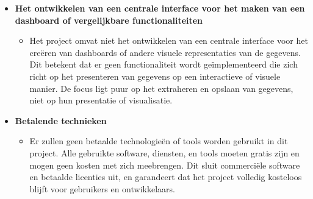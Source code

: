 \begin{itemize}
    \item \textbf{Het ontwikkelen van een centrale interface voor het maken van een dashboard of vergelijkbare functionaliteiten}
    \begin{itemize}
        \item Het project omvat niet het ontwikkelen van een centrale interface voor het creëren van dashboards of andere visuele representaties van de gegevens. Dit betekent dat er geen functionaliteit wordt geïmplementeerd die zich richt op het presenteren van gegevens op een interactieve of visuele manier. De focus ligt puur op het extraheren en opslaan van gegevens, niet op hun presentatie of visualisatie.
    \end{itemize}
    
    \item \textbf{Betalende technieken}
    \begin{itemize}
        \item Er zullen geen betaalde technologieën of tools worden gebruikt in dit project. Alle gebruikte software, diensten, en tools moeten gratis zijn en mogen geen kosten met zich meebrengen. Dit sluit commerciële software en betaalde licenties uit, en garandeert dat het project volledig kosteloos blijft voor gebruikers en ontwikkelaars.
    \end{itemize}
\end{itemize}


